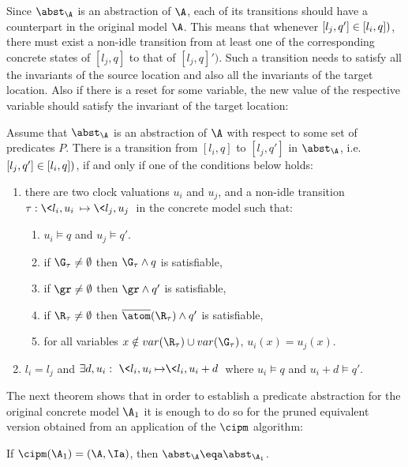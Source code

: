 \documentclass{eptcs}
\begin{document}
Since $\abst_\A$ is an abstraction of $\A$, each of its transitions should 
have a counterpart in the original model $\A$. This means that whenever 
$[l_j, q']\in \next([l_i, q])$, there must exist a non-idle transition from
at least one of the corresponding concrete states of $[l_j, q]$ to that of $[l_j, q]')$. 
Such a transition needs to satisfy all the invariants of the source location and also
all the invariants of the target location. Also if there is a reset for some variable, the new
value of the respective variable should satisfy the invariant of the target location:

\begin{lemma}
\label{lem.trans}
Assume that $\abst_\A$ is an abstraction of $\A$ with respect to some set of
predicates $P$.  There is a transition from $[l_i, q]$ to $[l_j, q']$ in
$\abst_\A$, i.e. $[l_j, q']\in \next([l_i, q])$, if and only if 
one of the conditions below holds:
\begin{enumerate}
\item there are two clock valuations $u_i$ and $u_j$, and a non-idle transition 
$\tau:\< l_i,u_i\> \mapsto\< l_j,u_j\>$ in the concrete model such that:
  \begin{enumerate}
   \item $u_i\models q$ and $u_j\models q'$.
   \item if $\G_{\tau}\neq \emptyset$ then $\G_{\tau} \land q$ is satisfiable, 
   \item if $\gr\neq \emptyset$ then $\gr \land q'$ is satisfiable, 
   \item if $\R_{\tau}\neq \emptyset$ then $\overline{\atom}(\R_{\tau}) \land q'$ is satisfiable, 
   \item for all variables $x\notin var(\R_{\tau})\cup var(\G_{\tau})$, $u_i(x)=u_j(x)$.
  \end{enumerate}
\item $l_i=l_j$ and $\exists d,u_i:~\< l_i,u_i\>{\mapsto}\<l_i,u_i+d\>$ where
  $u_i\models q$ and $u_i+d\models q'$.
\end{enumerate}
\end{lemma} 
The next theorem shows that in order to establish a predicate abstraction for the
original concrete model $\A_1$ it is enough to do so for the pruned
equivalent version obtained from an application of the $\cipm$ algorithm:

\begin{theorem}
\label{theo.approx}
If $\cipm(\A_1)=(\A,\Ia)$, then $\abst_\A\eqa \abst_{\A _1}$. \vspace{-0ex}
\end{theorem}
\end{document}
